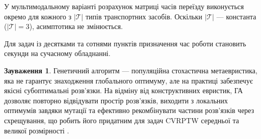 \documentclass[14pt,a4paper]{extarticle}
\theoremstyle{definition}
\newtheorem{remark}{Зауваження}[section]
\theoremstyle{plain}
\begin{document}
У мультимодальному варіанті розрахунок матриці часів переїзду виконується окремо для кожного з $|\mathcal{T}|$ типів транспортних засобів. Оскільки $|\mathcal{T}|$ --- константа ($|\mathcal{T}| = 3$), асимптотика не змінюється.

Для задач із десятками та сотнями пунктів призначення час роботи становить секунди на сучасному обладнанні.

\begin{remark}
Генетичний алгоритм --- популяційна стохастична метаевристика, яка не гарантує знаходження глобального оптимуму, але на практиці забезпечує якісні субоптимальні розв'язки. На відміну від конструктивних евристик, ГА дозволяє повторно відвідувати простір розв'язків, виходити з локальних оптимумів завдяки мутації та ефективно рекомбінувати частини розв'язків через схрещування, що робить його придатним для задач CVRPTW середньої та великої розмірності \cite{prins2004}.
\end{remark}

\newpage
\printbibliography
\end{document}
